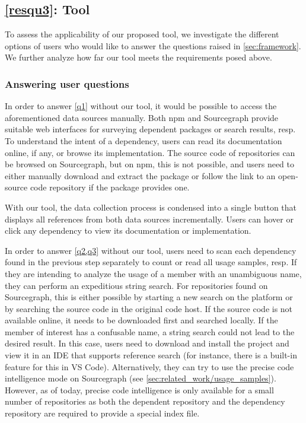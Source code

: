 \subsection{\ref{resqu3}: Tool}
\label{sec:evaluation/resqu3}

To assess the applicability of our proposed tool, we investigate the different options of users who would like to answer the questions raised in \cref{sec:framework}.
We further analyze how far our tool meets the requirements posed above.

\subsubsection{Answering user questions}

In order to answer \cref{q1} without our tool, it would be possible to access the aforementioned data sources manually.
Both npm and Sourcegraph provide suitable web interfaces for surveying dependent packages or search results, resp.
To understand the intent of a dependency, users can read its documentation online, if any, or browse its implementation.
The source code of repositories can be browsed on Sourcegraph, but on npm, this is not possible, and users need to either manually download and extract the package or follow the link to an open-source code repository if the package provides one.

With our tool, the data collection process is condensed into a single button that displays all references from both data sources incrementally.
Users can hover or click any dependency to view its documentation or implementation.

In order to answer \cref{q2,q3} without our tool, users need to scan each dependency found in the previous step separately to count or read all usage samples, resp.
If they are intending to analyze the usage of a member with an unambiguous name, they can perform an expeditious string search.
For repositories found on Sourcegraph, this is either possible by starting a new search on the platform or by searching the source code in the original code host.
If the source code is not available online, it needs to be downloaded first and searched locally.
If the member of interest has a confusable name, a string search could not lead to the desired result.
In this case, users need to download and install the project and view it in an IDE that supports reference search (for instance, there is a built-in feature for this in VS Code).
Alternatively, they can try to use the precise code intelligence mode on Sourcegraph (see \cref{sec:related_work/usage_samples}).
However, as of today, precise code intelligence is only available for a small number of repositories as both the dependent repository and the dependency repository are required to provide a special index file.

